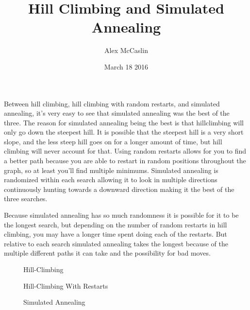 \documentclass[12pt]{article}
\title{Hill Climbing and Simulated Annealing}
\author{Alex McCaslin}
\date{March 18 2016}
\begin{document}
	\maketitle
	
	Between hill climbing, hill climbing with random restarts, and simulated annealing, it's very easy to see that simulated annealing was the best of the three. The reason for simulated annealing being the best is that hillclimbing will only go down the steepest hill. It is possible that the steepest hill is a very short slope, and the less steep hill goes on for a longer amount of time, but hill climbing will never account for that. Using random restarts allows for you to find a better path because you are able to restart in random positions throughout the graph, so at least you'll find multiple minimums. Simulated annealing is randomized within each search allowing it to look in multiple directions continuously hunting towards a downward direction making it the best of the three searches. 


	Because simulated annealing has so much randomness it is possible for it to be the longest search, but depending on the number of random restarts in hill climbing, you may have a longer time spent doing each of the restarts. But relative to each search simulated annealing takes the longest because of the multiple different paths it can take and the possibility for bad moves.
	
	\begin{figure}
		\caption{Hill-Climbing}
	\end{figure}
	
	\begin{figure}  
		\caption{Hill-Climbing With Restarts}
	\end{figure}

	\begin{figure}
		\caption{Simulated Annealing}
	\end{figure}	
\end{document}
